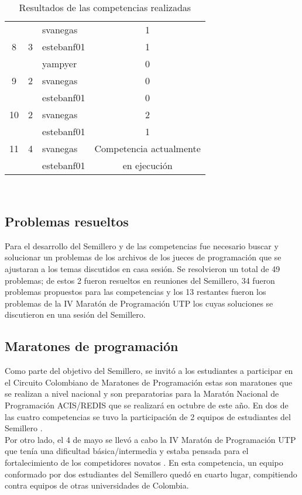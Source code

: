 \documentclass[conference]{IEEEtran}
\begin{document}
\begin{table}
\begin{tabular}{|c|c|l|c|}
		\hline
		  &   & svanegas & 1\\
		8 & 3 & estebanf01 & 1\\
		  &   & yampyer & 0\\
		\hline
		9 & 2 & svanegas & 0\\
		  &   & estebanf01 & 0\\
		\hline
		10 & 2 & svanegas & 2\\
		   &   & estebanf01 & 1\\
		\hline
		11 & 4 & svanegas & Competencia actualmente\\
		   &   & estebanf01 & en ejecución\\
		\hline
	\end{tabular} 
	
	\quad\\
	\caption{Resultados de las competencias realizadas}
	\label{Tabla:competencias}
\end{table}

\subsection{Problemas resueltos}
Para el desarrollo del Semillero y de las competencias fue necesario buscar y solucionar un problemas de los archivos de los jueces de programación que se ajustaran a los temas discutidos en casa sesión. Se resolvieron un total de 49 problemas; de estos 2 fueron resueltos en reuniones del Semillero, 34 fueron problemas propuestos para las competencias y los 13 restantes fueron los problemas de la IV Maratón de Programación UTP los cuyas soluciones se discutieron en una sesión del Semillero. 

\subsection{Maratones de programación}
Como parte del objetivo del Semillero, se invitó a los estudiantes a participar en el Circuito Colombiano de Maratones de Programación estas son maratones que se realizan a nivel nacional y son preparatorias para la Maratón Nacional de Programación ACIS/REDIS que se realizará en octubre de este año. En dos de las cuatro competencias se tuvo la participación de 2 equipos de estudiantes del Semillero \cite{CCMP}.\\
Por otro lado, el 4 de mayo se llevó a cabo la IV Maratón de Programación UTP que tenía una dificultad básica/intermedia y estaba pensada para el fortalecimiento de los competidores novatos \cite{UTP}. En esta competencia, un equipo conformado por dos estudiantes del Semillero quedó en cuarto lugar, compitiendo contra equipos de otras universidades de Colombia.\\
\end{document}
